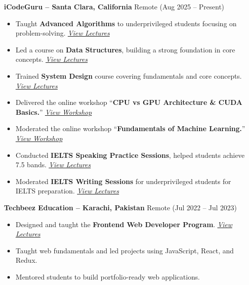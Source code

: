 \documentclass[a4paper,12pt]{article}
\begin{document}
\textbf{iCodeGuru – Santa Clara, California} \hfill {Remote (Aug 2025 -- Present)}
\vspace{-5pt}  %
\begin{itemize}
    \item Taught \textbf{Advanced Algorithms} to underprivileged students focusing on problem-solving. \hfill \textit{\href{https://youtube.com/playlist?list=PLYuuxnm8ZLJ62scCub7drXBQpXggF-84L&si=wuoRztBL4NI-THdn}{\underline{View Lectures}}}
    \item Led a course on \textbf{Data Structures}, building a strong foundation in core concepts. \hfill \textit{\href{https://youtube.com/playlist?list=PLYuuxnm8ZLJ4n8mLvD4o_zzP4mu-ng6rT&si=cuhbHQxvPSQU9WPo}{\underline{View Lectures}}}
    \item Trained \textbf{System Design} course covering fundamentals and core concepts. \hfill \textit{\href{https://www.youtube.com/playlist?list=PLMzzDDjWV53U}{\underline{View Lectures}}}
    \item Delivered the online workshop “\textbf{CPU vs GPU Architecture \& CUDA Basics.}” \hfill \textit{\href{https://www.linkedin.com/posts/aahmedfaraz_icodeguru-cuda-gpu-ugcPost-7482015584487124992-JTaG/?utm_source=share&utm_medium=member_desktop&rcm=ACoAADdJH-cBzPnm9JIV3RhrpK_TvX28bFX_rEY}{\underline{View Workshop}}}
    \item Moderated the online workshop “\textbf{Fundamentals of Machine Learning.}” \hfill \textit{\href{https://www.linkedin.com/posts/aahmedfaraz_machinelearning-artificialintelligence-python-activity-7471838701552259072-NtQJ?utm_source=share&utm_medium=member_desktop&rcm=ACoAADdJH-cBzPnm9JIV3RhrpK_TvX28bFX_rEY}{\underline{View Workshop}}}
    \item Conducted \textbf{IELTS Speaking Practice Sessions}, helped students achieve 7.5 bands. \hfill \textit{\href{https://www.youtube.com/playlist?list=PLBXi_ryTbHgrKS_TljSEjycW0LwMTWfD3}{\underline{View Lectures}}}
    \item Moderated \textbf{IELTS Writing Sessions} for underprivileged students for IELTS preparation. \hfill \textit{\href{https://www.youtube.com/playlist?list=PLBXi_ryTbHgpIQkoKyExNTQtdQeGfZYHt}{\underline{View Lectures}}}
\end{itemize}

\vspace{20pt}
\textbf{Techbeez Education – Karachi, Pakistan} \hfill {Remote (Jul 2022 -- Jul 2023)}
\vspace{-5pt}  %
\begin{itemize}
    \item Designed and taught the \textbf{Frontend Web Developer Program}. \hfill \textit{\href{https://www.youtube.com/playlist?list=PLYuuxnm8ZLJ7I8v7wDf_2jbYFwURwn9kT}{\underline{View Lectures}}}
    \item Taught web fundamentals and led projects using JavaScript, React, and Redux.
    \item Mentored students to build portfolio-ready web applications.
\end{itemize}
\end{document}
